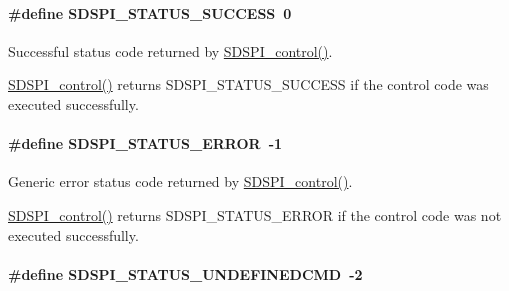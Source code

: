 \paragraph[{S\+D\+S\+P\+I\+\_\+\+S\+T\+A\+T\+U\+S\+\_\+\+S\+U\+C\+C\+E\+S\+S}]{\setlength{\rightskip}{0pt plus 5cm}\#define S\+D\+S\+P\+I\+\_\+\+S\+T\+A\+T\+U\+S\+\_\+\+S\+U\+C\+C\+E\+S\+S~0}\label{_s_d_s_p_i_8h_a5ebecb6ddc00b47b11c1d5ab3ce04108}


Successful status code returned by \hyperlink{_s_d_s_p_i_8h_a541a1db109382fe090ed7a9209a34f61}{S\+D\+S\+P\+I\+\_\+control()}. 

\hyperlink{_s_d_s_p_i_8h_a541a1db109382fe090ed7a9209a34f61}{S\+D\+S\+P\+I\+\_\+control()} returns S\+D\+S\+P\+I\+\_\+\+S\+T\+A\+T\+U\+S\+\_\+\+S\+U\+C\+C\+E\+S\+S if the control code was executed successfully. 
\paragraph[{S\+D\+S\+P\+I\+\_\+\+S\+T\+A\+T\+U\+S\+\_\+\+E\+R\+R\+O\+R}]{\setlength{\rightskip}{0pt plus 5cm}\#define S\+D\+S\+P\+I\+\_\+\+S\+T\+A\+T\+U\+S\+\_\+\+E\+R\+R\+O\+R~-\/1}\label{_s_d_s_p_i_8h_a61e58103fc719d0afafddfc7dd11b49d}


Generic error status code returned by \hyperlink{_s_d_s_p_i_8h_a541a1db109382fe090ed7a9209a34f61}{S\+D\+S\+P\+I\+\_\+control()}. 

\hyperlink{_s_d_s_p_i_8h_a541a1db109382fe090ed7a9209a34f61}{S\+D\+S\+P\+I\+\_\+control()} returns S\+D\+S\+P\+I\+\_\+\+S\+T\+A\+T\+U\+S\+\_\+\+E\+R\+R\+O\+R if the control code was not executed successfully. 
\paragraph[{S\+D\+S\+P\+I\+\_\+\+S\+T\+A\+T\+U\+S\+\_\+\+U\+N\+D\+E\+F\+I\+N\+E\+D\+C\+M\+D}]{\setlength{\rightskip}{0pt plus 5cm}\#define S\+D\+S\+P\+I\+\_\+\+S\+T\+A\+T\+U\+S\+\_\+\+U\+N\+D\+E\+F\+I\+N\+E\+D\+C\+M\+D~-\/2}\label{_s_d_s_p_i_8h_af65a39f487c0da299c3e0fc77a70a4c3}


